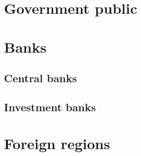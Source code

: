 \documentclass[letterpaper,10pt,english]{jupyterBook}
\begin{document}
\section{Government \sphinxhyphen{} public}
\label{\detokenize{ch/actors:government-public}}\label{\detokenize{ch/actors:fin-edu-actors-government}}

\section{Banks}
\label{\detokenize{ch/actors:banks}}\label{\detokenize{ch/actors:fin-edu-actors-banks}}

\subsection{Central banks}
\label{\detokenize{ch/actors:central-banks}}\label{\detokenize{ch/actors:fin-edu-actors-banks-cb}}

\subsection{Investment banks}
\label{\detokenize{ch/actors:investment-banks}}\label{\detokenize{ch/actors:fin-edu-actors-banks-inv}}

\section{Foreign regions}
\label{\detokenize{ch/actors:foreign-regions}}\label{\detokenize{ch/actors:fin-edu-actors-banks-foreign}}
\sphinxstepscope
\end{document}
